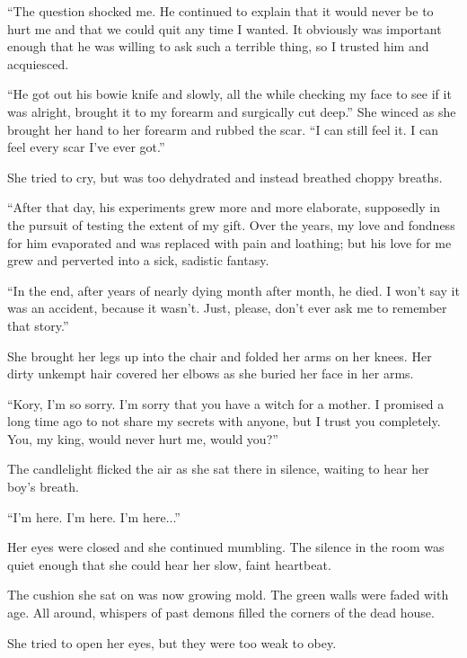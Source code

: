 ``The question shocked me. He continued to explain that it would never be to hurt me and that we could quit any time I wanted. It obviously was important enough that he was willing to ask such a terrible thing, so I trusted him and acquiesced.

``He got out his bowie knife and slowly, all the while checking my face to see if it was alright, brought it to my forearm and surgically cut deep.'' She winced as she brought her hand to her forearm and rubbed the scar. ``I can still feel it. I can feel every scar I've ever got.''

She tried to cry, but was too dehydrated and instead breathed choppy breaths.

``After that day, his experiments grew more and more elaborate, supposedly in the pursuit of testing the extent of my gift. Over the years, my love and fondness for him evaporated and was replaced with pain and loathing; but his love for me grew and perverted into a sick, sadistic fantasy.

``In the end, after years of nearly dying month after month, he died. I won't say it was an accident, because it wasn't. Just, please, don't ever ask me to remember that story.''

She brought her legs up into the chair and folded her arms on her knees. Her dirty unkempt hair covered her elbows as she buried her face in her arms.

``Kory, I'm so sorry. I'm sorry that you have a witch for a mother. I promised a long time ago to not share my secrets with anyone, but I trust you completely. You, my king, would never hurt me, would you?''

The candlelight flicked the air as she sat there in silence, waiting to hear her boy's breath.

\line



``I'm here. I'm here. I'm here...''

Her eyes were closed and she continued mumbling. The silence in the room was quiet enough that she could hear her slow, faint heartbeat.

The cushion she sat on was now growing mold. The green walls were faded with age. All around, whispers of past demons filled the corners of the dead house.

She tried to open her eyes, but they were too weak to obey.

